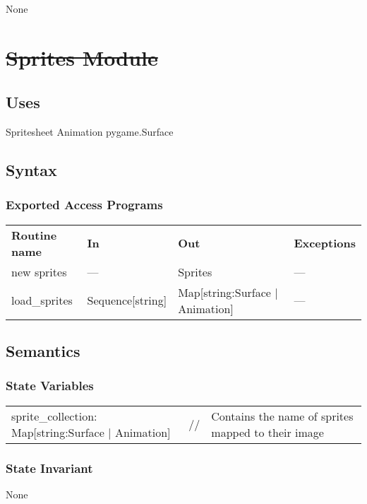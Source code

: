 \documentclass[12pt]{article}
\begin{document}
None

\newpage

\section* {\st{Sprites Module}}

\subsection* {Uses}
Spritesheet
Animation
pygame.Surface
\subsection* {Syntax}

\subsubsection* {Exported Access Programs}

\begin{tabular}{| l | l | l | l |}
\hline
\textbf{Routine name} & \textbf{In} & \textbf{Out} & \textbf{Exceptions}\\
new sprites & --- & Sprites & ---\\
\hline
load\_sprites & Sequence[string] & Map[string:Surface | Animation] & ---\\
\hline
\end{tabular}

\subsection* {Semantics}

\subsubsection* {State Variables}

\begin{tabular}{lll}
    sprite\_collection: Map[string:Surface | Animation] & // & Contains the name of sprites mapped to their image
\end{tabular}

\subsubsection* {State Invariant}

None
\end{document}
